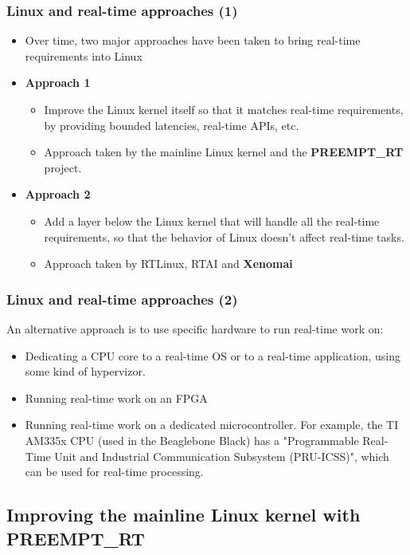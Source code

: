 \begin{frame}
  \frametitle{Linux and real-time approaches (1)}
  \begin{itemize}
  \item Over time, two major approaches have been taken to bring
    real-time requirements into Linux
  \item {\bf Approach 1}
    \begin{itemize}
    \item Improve the Linux kernel itself so that it matches real-time
      requirements, by providing bounded latencies, real-time APIs,
      etc.
    \item Approach taken by the mainline Linux kernel and the
      {\bf PREEMPT\_RT} project.
    \end{itemize}
  \item {\bf Approach 2}
    \begin{itemize}
    \item Add a layer below the Linux kernel that will handle all the
      real-time requirements, so that the behavior of Linux doesn't
      affect real-time tasks.
    \item Approach taken by RTLinux, RTAI and {\bf Xenomai}
    \end{itemize}
  \end{itemize}
\end{frame}

\begin{frame}
  \frametitle{Linux and real-time approaches (2)}
  An alternative approach is to use specific hardware to run real-time
  work on:
  \begin{itemize}
  \item Dedicating a CPU core to a real-time OS or to a real-time
        application, using some kind of hypervizor.
  \item Running real-time work on an FPGA
  \item Running real-time work on a dedicated microcontroller.
        For example, the TI AM335x CPU (used in the Beaglebone Black)
        has a "Programmable Real-Time Unit and Industrial
        Communication Subsystem (PRU-ICSS)", which can be used for
        real-time processing.
  \end{itemize}
\end{frame}

\subsection[PREEMPT\_RT Patches]{Improving the mainline Linux kernel with
  PREEMPT\_RT}

